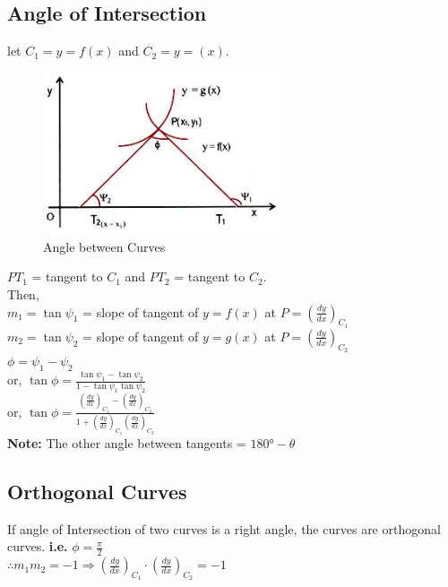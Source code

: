 \documentclass[11pt,a4paper,landscape]{article}
\begin{document}
\begin{multicols*}{2}
	\subsection{Angle of Intersection}
	let $C_1=y=f(x)$ and $C_2=y=(x)$.
	\begin{figure}[H]
		\centering
		\includegraphics[width=7cm]{P2}
		\caption{Angle between Curves}
	\end{figure}
	$PT_1$ = tangent to $C_1$ and $PT_2$ = tangent to $C_2$.\\
	Then,\\
	$m_1=\tan{\psi_1}$ = slope of tangent of $y=f(x)$ at $P=\left(\frac{dy}{dx}\right)_{C_1}$\\[2mm]
	$m_2=\tan{\psi_2}$ = slope of tangent of $y=g(x)$ at $P=\left(\frac{dy}{dx}\right)_{C_2}$\\[2mm]
	$\phi=\psi_1-\psi_2$\\
	or, $\tan{\phi}=\frac{\tan{\psi_1}-\tan{\psi_2}}{1-\tan{\psi_1}\tan{\psi_2}}$\\[3mm]
	or, $\tan{\phi}=\frac{\left(\frac{dy}{dx}\right)_{C_1}-\left(\frac{dy}{dx}\right)_{C_2}}{1+\left(\frac{dy}{dx}\right)_{C_1}\left(\frac{dy}{dx}\right)_{C_2}}$\\[3mm]
	\textbf{Note:} The other angle between tangents = $\ang{180}-\theta$
	\subsection{Orthogonal Curves}
	If angle of Intersection of two curves is a right angle, the curves are orthogonal curves. \textbf{i.e.} $\phi=\frac{\pi}{2}$\\[2mm]
	$\therefore m_1m_2 = -1 \Rightarrow \left(\frac{dy}{dx}\right)_{C_1} \cdot \left(\frac{dy}{dx}\right)_{C_2} = -1$

\end{multicols*}
\end{document}
